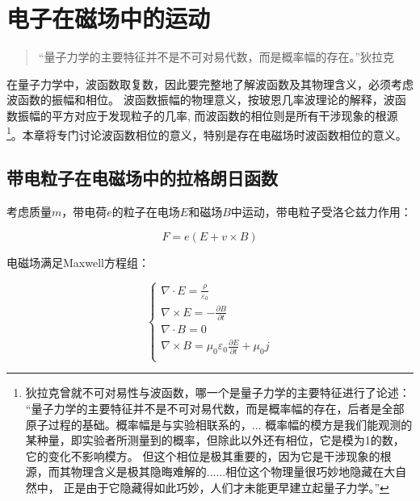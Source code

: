 \section{电子在磁场中的运动}

\begin{quotation}
``量子力学的主要特征并不是不可对易代数，而是概率幅的存在。''\qquad 狄拉克
\end{quotation}

在量子力学中，波函数取复数，因此要完整地了解波函数及其物理含义，必须考虑波函数的振幅和相位。
波函数振幅的物理意义，按玻恩几率波理论的解释，波函数振幅的平方对应于发现粒子的几率, 而波函数的相位则是所有干涉现象的根源\footnote{
狄拉克曾就不可对易性与波函数，哪一个是量子力学的主要特征进行了论述：
``量子力学的主要特征并不是不可对易代数，而是概率幅的存在，后者是全部原子过程的基础。概率幅是与实验相联系的，...
概率幅的模方是我们能观测的某种量，即实验者所测量到的概率，但除此以外还有相位，它是模为1的数，它的变化不影响模方。
但这个相位是极其重要的，因为它是干涉现象的根源，而其物理含义是极其隐晦难解的......相位这个物理量很巧妙地隐藏在大自然中，
正是由于它隐藏得如此巧妙，人们才未能更早建立起量子力学。''
}。本章将专门讨论波函数相位的意义，特别是存在电磁场时波函数相位的意义。

\subsection{带电粒子在电磁场中的拉格朗日函数}

考虑质量$m$，带电荷$e$的粒子在电场$E$和磁场$B$中运动，带电粒子受洛仑兹力作用：

\begin{equation}\label{18-1}
F = e\left( {E + v \times B} \right)
\end{equation}

电磁场满足Maxwell方程组：


\begin{equation}
\left\{ \begin{array}{l}
 \nabla  \cdot E = \frac{\rho }{{\varepsilon _0 }} \\
 \nabla  \times E =  - \frac{{\partial B}}{{\partial t}} \\
 \nabla  \cdot B = 0 \\
 \nabla  \times B = \mu _0 \varepsilon _0 \frac{{\partial E}}{{\partial t}} + \mu _0 j \\
 \end{array} \right.
\end{equation}


